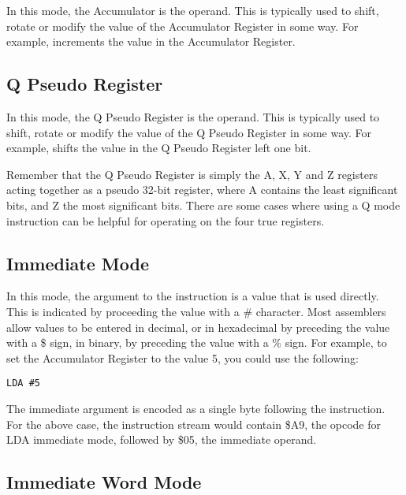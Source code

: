 In this mode, the Accumulator is the operand. This is typically used to shift,
rotate or modify the value of the Accumulator Register in some way.  For example,
 increments the value in the Accumulator Register.

\subsection{Q Pseudo Register}

In this mode, the Q Pseudo Register is the operand. This is typically used to shift,
rotate or modify the value of the Q Pseudo Register in some way.  For example,
 shifts the value in the Q Pseudo Register left one bit.

Remember that the Q Pseudo Register is simply the A, X, Y and Z registers acting together
as a pseudo 32-bit register, where A contains the least significant bits, and Z the
most significant bits.  There are some cases where using a Q mode instruction can be
helpful for operating on the four true registers.

\subsection{Immediate Mode}

In this mode, the argument to the instruction is a value that is used directly.
This is indicated by proceeding the value with a \# character. Most assemblers allow
values to be entered in decimal, or in hexadecimal by preceding the value with a \$ sign,
in binary, by preceding the value with a \% sign.  For example, to set the Accumulator
Register to the value 5, you could use the following:

\begin{tcolorbox}[colback=black,coltext=white]
\verbatimfont{\codefont}
\begin{verbatim}
LDA #5
\end{verbatim}
\end{tcolorbox}

The immediate argument is encoded as a single byte following the instruction.  For the above
case, the instruction stream would contain \$A9, the opcode for LDA immediate mode, followed
by \$05, the immediate operand.

\subsection{Immediate Word Mode}

